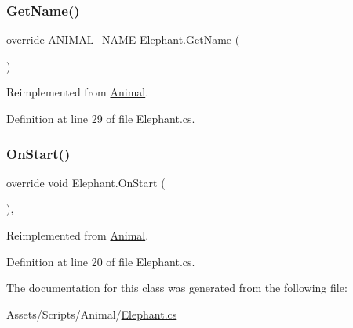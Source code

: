 \subsubsection{\texorpdfstring{Get\+Name()}{GetName()}}
{\footnotesize\ttfamily override \mbox{\hyperlink{_animal_8cs_a2fa5713399b84d1b88dae9196837af50}{A\+N\+I\+M\+A\+L\+\_\+\+N\+A\+ME}} Elephant.\+Get\+Name (\begin{DoxyParamCaption}{ }\end{DoxyParamCaption})\hspace{0.3cm}{\ttfamily [virtual]}}



Reimplemented from \mbox{\hyperlink{class_animal_ab66ea3e3cb15a2b236ba9ba4d589ca69}{Animal}}.



Definition at line 29 of file Elephant.\+cs.

\mbox{\label{class_elephant_a4e12b9f8aa13e0ecb5b40c1d68f966aa}} 
\subsubsection{\texorpdfstring{On\+Start()}{OnStart()}}
{\footnotesize\ttfamily override void Elephant.\+On\+Start (\begin{DoxyParamCaption}{ }\end{DoxyParamCaption})\hspace{0.3cm}{\ttfamily [protected]}, {\ttfamily [virtual]}}



Reimplemented from \mbox{\hyperlink{class_animal_a5e8ba3858f4d2c35c4a8d42fdbcc66b5}{Animal}}.



Definition at line 20 of file Elephant.\+cs.



The documentation for this class was generated from the following file\+:\begin{DoxyCompactItemize}
\item 
Assets/\+Scripts/\+Animal/\mbox{\hyperlink{_elephant_8cs}{Elephant.\+cs}}\end{DoxyCompactItemize}
